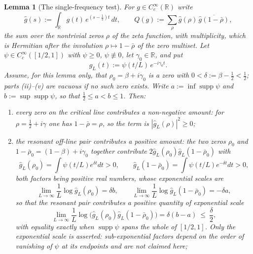 \documentclass[11pt]{amsart}
\newtheorem{lemma}[theorem]{Lemma}
\theoremstyle{definition}
\theoremstyle{remark}
\newcommand{\R}{\mathbb R}
\newcommand{\supp}{\operatorname{supp}}
\begin{document}
\begin{lemma}[The single-frequency test]\label{lem:singlefreq}
For $g\in C_c^\infty(\R)$ write
\begin{equation}\label{eq:zerosum}
  \widehat g(s):=\int_\R g(t)\,e^{(s-\frac12)t}\,dt,\qquad
  Q(g):=\sum_\rho\widehat g(\rho)\,\overline{\widehat g(1-\bar\rho)},
\end{equation}
the sum over the nontrivial zeros $\rho$ of the zeta function, with
multiplicity, which is
Hermitian after the involution $\rho\mapsto1-\bar\rho$ of the zero multiset.
Let $\psi\in C_c^\infty([1/2,1])$ with $\psi\ge0$, $\psi\not\equiv0$, let
$\gamma_0\in\R$, and put
\begin{equation}\label{eq:singlefreqtest}
  g_L(t):=\psi(t/L)\,e^{-i\gamma_0t}.
\end{equation}
Assume, for this lemma only, that $\rho_0=\beta+i\gamma_0$ is a zero with
$0<\delta:=\beta-\tfrac12<\tfrac12$; parts (ii)--(v) are vacuous if no such
zero exists. Write $a:=\inf\supp\psi$ and $b:=\sup\supp\psi$, so that
$\tfrac12\le a<b\le1$. Then:
\begin{enumerate}
\item[(i)] every zero on the critical line contributes a non-negative amount:
for $\rho=\tfrac12+i\gamma$ one has $1-\bar\rho=\rho$, so the term is
$|\widehat g_L(\rho)|^2\ge0$;
\item[(ii)] the resonant off-line pair contributes a \emph{positive} amount:
the two zeros $\rho_0$ and $1-\bar\rho_0=(1-\beta)+i\gamma_0$ together
contribute $2\widehat g_L(\rho_0)\widehat g_L(1-\bar\rho_0)$ with
\begin{equation}\label{eq:resonantpair}
  \widehat g_L(\rho_0)=\int\psi(t/L)e^{\delta t}dt>0,\qquad
  \widehat g_L(1-\bar\rho_0)=\int\psi(t/L)e^{-\delta t}dt>0,
\end{equation}
both factors being positive real numbers, whose exponential scales are
\begin{equation}\label{eq:laplacescales}
  \lim_{L\to\infty}\frac1L\log\widehat g_L(\rho_0)=\delta b,\qquad
  \lim_{L\to\infty}\frac1L\log\widehat g_L(1-\bar\rho_0)=-\delta a,
\end{equation}
so that the resonant pair contributes a positive quantity of exponential scale
\[
  \lim_{L\to\infty}\frac1L
   \log\bigl(\widehat g_L(\rho_0)\widehat g_L(1-\bar\rho_0)\bigr)
   =\delta(b-a)\ \le\ \frac\delta2 ,
\]
with equality exactly when $\supp\psi$ spans the whole of $[1/2,1]$. Only the
exponential scale is asserted: sub-exponential factors depend on the order of
vanishing of $\psi$ at its endpoints and are not claimed here;

\end{enumerate}
\end{lemma}
\end{document}
